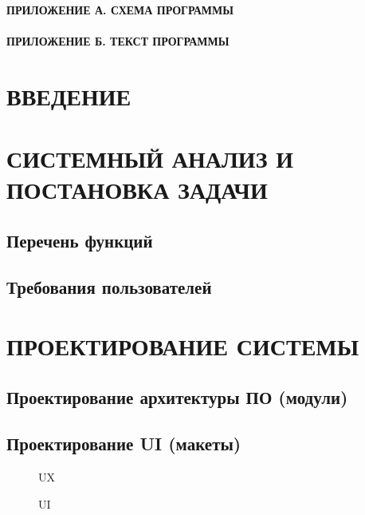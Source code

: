 \documentclass[12pt, a4paper, simple]{eskdtext}
\begin{document}
    

    \tableofcontents
    \thispagestyle{empty}                                
    \paragraph{ПРИЛОЖЕНИЕ А. СХЕМА ПРОГРАММЫ}
    \paragraph{ПРИЛОЖЕНИЕ Б. ТЕКСТ ПРОГРАММЫ}
    \newpage

    \newpage
    \section*{ВВЕДЕНИЕ}
    \newpage

    \section{СИСТЕМНЫЙ АНАЛИЗ И ПОСТАНОВКА ЗАДАЧИ}
    \subsection{Перечень функций}
    \subsection{Требования пользователей}
    \newpage

    \section{ПРОЕКТИРОВАНИЕ СИСТЕМЫ}
    \subsection{Проектирование архитектуры ПО (модули)}
    \subsection{Проектирование UI (макеты)}

    \begin{figure}[!h]
        \centering
        \caption{UX}
    \end{figure}

    \begin{figure}[!h]
        \centering
        \caption{UI}
    \end{figure}
\end{document}
